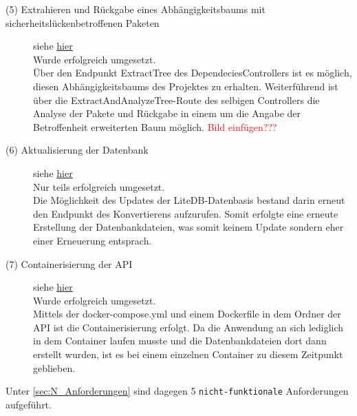 \begin{description}
        \item[(5) Extrahieren und Rückgabe eines Abhängigkeitsbaums mit sicher\-heits\-lücken\-betroffenen Paketen] siehe \hyperref[f:five]{\underline{hier}} \hfill \\
            Wurde erfolgreich umgesetzt.
            \\
            Über den Endpunkt ExtractTree des DependeciesControllers ist es möglich, diesen Abhängigkeitsbaums des Projektes zu erhalten.
            Weiterführend ist über die ExtractAndAnalyzeTree-Route des selbigen Controllers die Analyse der Pakete und Rückgabe in einem um die Angabe der Betroffenheit erweiterten Baum möglich.
            \textcolor{red}{Bild einfügen???}
        \item[(6) Aktualisierung der Datenbank] siehe \hyperref[f:six]{\underline{hier}} \hfill \\
            Nur teils erfolgreich umgesetzt.
            \\
            Die Möglichkeit des Updates der LiteDB-Datenbasis bestand darin erneut den Endpunkt des Konvertierens aufzurufen.
            Somit erfolgte eine erneute Erstellung der Datenbankdateien, was somit keinem Update sondern eher einer Erneuerung entsprach.
        \item[(7) Containerisierung der \ac{API}] siehe \hyperref[f:seven]{\underline{hier}} \hfill \\
            Wurde erfolgreich umgesetzt.
            \\
            Mittels der docker-compose.yml und einem Dockerfile in dem Ordner der API ist die Containerisierung erfolgt.
            Da die Anwendung an sich lediglich in dem Container laufen musste und die Datenbankdateien dort dann erstellt wurden, ist es bei einem einzelnen Container zu diesem Zeitpunkt geblieben.
    \end{description}

    \noindent Unter \ref{sec:N_Anforderungen}  sind dagegen 5 \texttt{nicht-funktionale} Anforderungen aufgeführt.

